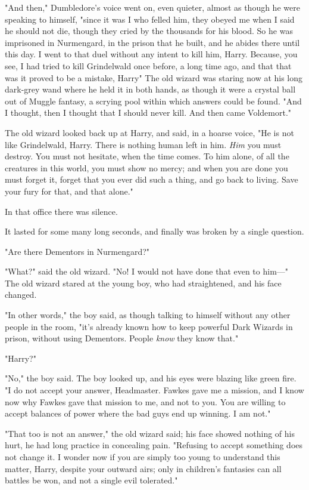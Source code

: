 "And then," Dumbledore's voice went on, even quieter, almost as though he were
speaking to himself, "since it was I who felled him, they obeyed me when I said
he should not die, though they cried by the thousands for his blood. So he was
imprisoned in Nurmengard, in the prison that he built, and he abides there
until this day. I went to that duel without any intent to kill him, Harry.
Because, you see, I had tried to kill Grindelwald once before, a long time ago,
and that{\el} that was{\el} it proved to be{\el} a mistake,
Harry{\el}" The old wizard was staring now at his long dark-grey wand where
he held it in both hands, as though it were a crystal ball out of Muggle
fantasy, a scrying pool within which answers could be found. "And I thought,
then{\el} I thought that I should never kill. And then came Voldemort."

The old wizard looked back up at Harry, and said, in a hoarse voice, "He is not
like Grindelwald, Harry. There is nothing human left in him. \emph{Him} you
must destroy. You must not hesitate, when the time comes. To him alone, of all
the creatures in this world, you must show no mercy; and when you are done you
must forget it, forget that you ever did such a thing, and go back to living.
Save your fury for that, and that alone."

In that office there was silence.

It lasted for some many long seconds, and finally was broken by a single
question.

"Are there Dementors in Nurmengard?"

"What?" said the old wizard. "No! I would not have done that even to him—"
\sbreak
The old wizard stared at the young boy, who had straightened, and his face
changed.

"In other words," the boy said, as though talking to himself without any other
people in the room, "it's already known how to keep powerful Dark Wizards in
prison, without using Dementors. People \emph{know} they know that."

"Harry{\el}?"

"No," the boy said. The boy looked up, and his eyes were blazing like green
fire. "I do not accept your answer, Headmaster. Fawkes gave me a mission, and I
know now why Fawkes gave that mission to me, and not to you. You are willing to
accept balances of power where the bad guys end up winning. I am not."

"That too is not an answer," the old wizard said; his face showed nothing of
his hurt, he had long practice in concealing pain. "Refusing to accept
something does not change it. I wonder now if you are simply too young to
understand this matter, Harry, despite your outward airs; only in children's
fantasies can all battles be won, and not a single evil tolerated."

